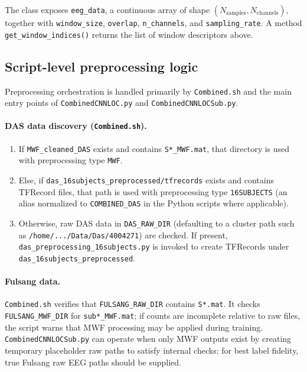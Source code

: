 \documentclass[11pt,a4paper]{article}
\newcommand{\py}[1]{\texttt{#1}}
\begin{document}
The class exposes \py{eeg\_data}, a continuous array of shape $(N_{\text{samples}}, N_{\text{channels}})$, together with \texttt{window\_size}, \texttt{overlap}, \texttt{n\_channels}, and \texttt{sampling\_rate}. A method \py{get\_window\_indices()} returns the list of window descriptors above.

\subsection{Script-level preprocessing logic}
\label{sec:script_preprocess}

Preprocessing orchestration is handled primarily by \py{Combined.sh} and the main entry points of \py{CombinedCNNLOC.py} and \py{CombinedCNNLOCSub.py}.

\paragraph{DAS data discovery (\py{Combined.sh}).}
\begin{enumerate}
  \item If \py{MWF\_cleaned\_DAS} exists and contains \texttt{S*\_MWF.mat}, that directory is used with preprocessing type \texttt{MWF}.
  \item Else, if \py{das\_16subjects\_preprocessed/tfrecords} exists and contains TFRecord files, that path is used with preprocessing type \texttt{16SUBJECTS} (an alias normalized to \texttt{COMBINED\_DAS} in the Python scripts where applicable).
  \item Otherwise, raw DAS data in \texttt{DAS\_RAW\_DIR} (defaulting to a cluster path such as \texttt{/home/.../Data/Das/4004271}) are checked. If present, \py{das\_preprocessing\_16subjects.py} is invoked to create TFRecords under \py{das\_16subjects\_preprocessed}.
\end{enumerate}

\paragraph{Fulsang data.} \py{Combined.sh} verifies that \texttt{FULSANG\_RAW\_DIR} contains \texttt{S*.mat}. It checks \texttt{FULSANG\_MWF\_DIR} for \texttt{sub*\_MWF.mat}; if counts are incomplete relative to raw files, the script warns that MWF processing may be applied during training. \py{CombinedCNNLOCSub.py} can operate when only MWF outputs exist by creating temporary placeholder raw paths to satisfy internal checks; for best label fidelity, true Fulsang raw EEG paths should be supplied.
\end{document}
